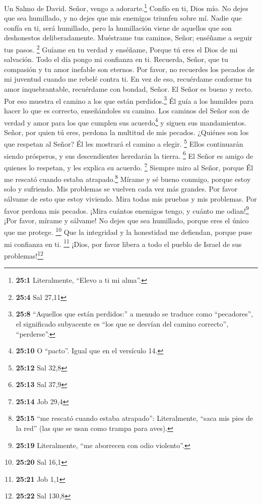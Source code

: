 Un Salmo de David.  Señor, vengo a adorarte.\footnote{\textbf{25:1}
  Literalmente, ``Elevo a ti mi alma''.}  Confío en ti,
Dios mío. No dejes que sea humillado, y no dejes que mis enemigos
triunfen sobre mí.  Nadie que confía en ti, será
humillado, pero la humillación viene de aquellos que son deshonestos
deliberadamente.  Muéstrame tus caminos, Señor; enséñame a
seguir tus pasos. \footnote{\textbf{25:4} Sal 27,11} 
Guíame en tu verdad y enséñame, Porque tú eres el Dios de mi salvación.
Todo el día pongo mi confianza en ti.  Recuerda, Señor,
que tu compasión y tu amor inefable son eternos.  Por
favor, no recuerdes los pecados de mi juventud cuando me rebelé contra
ti. En vez de eso, recuérdame conforme tu amor inquebrantable,
recuérdame con bondad, Señor.  El Señor es bueno y recto.
Por eso muestra el camino a los que están perdidos.\footnote{\textbf{25:8}
  ``Aquellos que están perdidos:'' a menudo se traduce como
  ``pecadores'', el significado subyacente es ``los que se desvían del
  camino correcto'', ``perderse''.}  Él guía a los
humildes para hacer lo que es correcto, enseñándoles su camino.
 Los caminos del Señor son de verdad y amor para los que
cumplen sus acuerdo\footnote{\textbf{25:10} O ``pacto''. Igual que en el
  versículo 14.} y siguen sus mandamientos.  Señor, por
quien tú eres, perdona la multitud de mis pecados. 
¿Quiénes son los que respetan al Señor? Él les mostrará el camino a
elegir. \footnote{\textbf{25:12} Sal 32,8}  Ellos
continuarán siendo prósperos, y sus descendientes heredarán la tierra.
\footnote{\textbf{25:13} Sal 37,9}  El Señor es amigo de
quienes lo respetan, y les explica su acuerdo. \footnote{\textbf{25:14}
  Job 29,4}  Siempre miro al Señor, porque Él me rescató
cuando estaba atrapado.\footnote{\textbf{25:15} ``me rescató cuando
  estaba atrapado'': Literalmente, ``saca mis pies de la red'' (las que
  se usan como trampa para aves).}  Mírame y sé bueno
conmigo, porque estoy solo y sufriendo.  Mis problemas se
vuelven cada vez más grandes. Por favor sálvame de esto que estoy
viviendo.  Mira todas mis pruebas y mis problemas. Por
favor perdona mis pecados.  ¡Mira cuántos enemigos tengo,
y cuánto me odian!\footnote{\textbf{25:19} Literalmente, ``me aborrecen
  con odio violento''.}  ¡Por favor, mírame y sálvame! No
dejes que sea humillado, porque eres el único que me protege.
\footnote{\textbf{25:20} Sal 16,1}  Que la integridad y
la honestidad me defiendan, porque puse mi confianza en ti. \footnote{\textbf{25:21}
  Job 1,1}  ¡Dios, por favor libera a todo el pueblo de
Israel de sus problemas!\footnote{\textbf{25:22} Sal 130,8}

